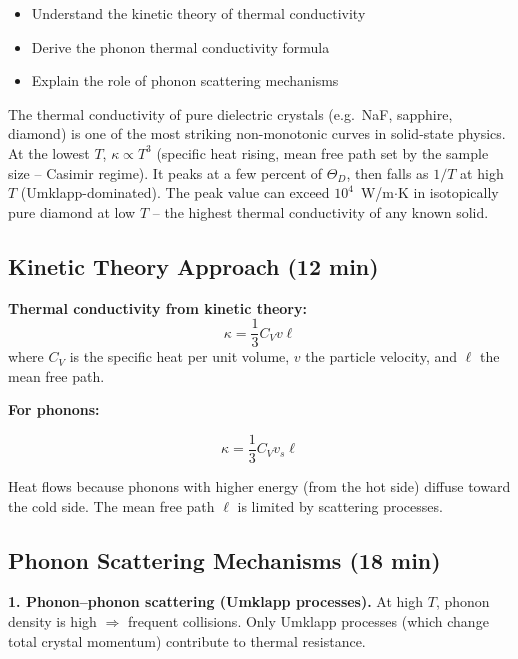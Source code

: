 \documentclass[11pt,a4paper]{article}
\begin{document}
\begin{keybox}
\begin{itemize}
\item Understand the kinetic theory of thermal conductivity
\item Derive the phonon thermal conductivity formula
\item Explain the role of phonon scattering mechanisms
\end{itemize}
\end{keybox}

\begin{expbox}
The thermal conductivity of pure dielectric crystals (e.g.\ NaF, sapphire, diamond)
is one of the most striking non-monotonic curves in solid-state physics. At the
lowest $T$, $\kappa\propto T^3$ (specific heat rising, mean free path set by the
sample size -- Casimir regime). It peaks at a few percent of $\Theta_D$, then
falls as $1/T$ at high $T$ (Umklapp-dominated). The peak value can exceed
$10^4$~W/m$\cdot$K in isotopically pure diamond at low $T$ -- the highest thermal
conductivity of any known solid.
\end{expbox}

\subsection{Kinetic Theory Approach \hfill \small(12 min)}

\textbf{Thermal conductivity from kinetic theory:}
\[
\kappa = \frac13C_Vv\ell
\]
where $C_V$ is the specific heat per unit volume, $v$ the particle velocity, and
$\ell$ the mean free path.

\textbf{For phonons:}
\begin{keybox}
\[
\kappa = \frac13C_Vv_s\ell
\]
\end{keybox}

\begin{physbox}
Heat flows because phonons with higher energy (from the hot side) diffuse toward the
cold side. The mean free path $\ell$ is limited by scattering processes.
\end{physbox}

\subsection{Phonon Scattering Mechanisms \hfill \small(18 min)}

\textbf{1. Phonon--phonon scattering (Umklapp processes).}
At high $T$, phonon density is high $\Rightarrow$ frequent collisions. Only Umklapp
processes (which change total crystal momentum) contribute to thermal resistance.
\end{document}
